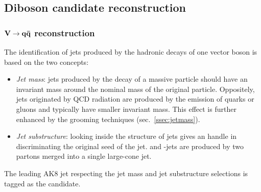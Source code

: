 \subsection{Diboson candidate reconstruction}
\label{ssec:final_dib_cand}

\subsubsection{$\mathbf{V \rightarrow q \bar{q}}$ reconstruction}
\label{ssec:Vcand}
The identification of jets produced by the hadronic decays of one vector boson is based on the two concepts:
\begin{itemize}
  \item \textit{Jet mass}: jets produced by the decay of a massive particle should have an invariant mass around the nominal mass of the original particle. Oppositely, jets originated by QCD radiation are produced by the emission of quarks or gluons and typically have smaller invariant mass. This effect is further enhanced by the grooming techniques (sec.~\ref{ssec:jetmass}).
  \item \textit{Jet substructure}: looking inside the structure of jets gives an handle in discriminating the original seed of the jet. \Z and \W-jets are produced by two partons merged into a single large-cone jet.
\end{itemize}

\noindent The leading AK8 jet respecting the jet mass and jet substructure selections is tagged as the \V candidate.

